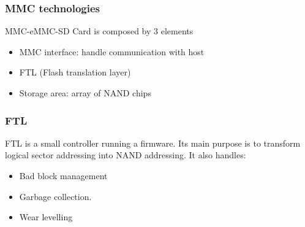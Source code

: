 \documentclass[resume]{subfiles}
\begin{document}
\subsubsection{MMC technologies}
MMC-eMMC-SD Card is composed by 3 elements
\begin{itemize}
    \item MMC interface: handle communication with host
    \item FTL (Flash translation layer)
    \item Storage area: array of NAND chips
\end{itemize}

\subsubsection{FTL}
FTL is a small controller running a firmware. Its main purpose is to transform logical sector addressing into NAND addressing. It also handles:
\begin{itemize}
    \item Bad block management
    \item Garbage collection.
    \item Wear levelling
\end{itemize}
\end{document}
